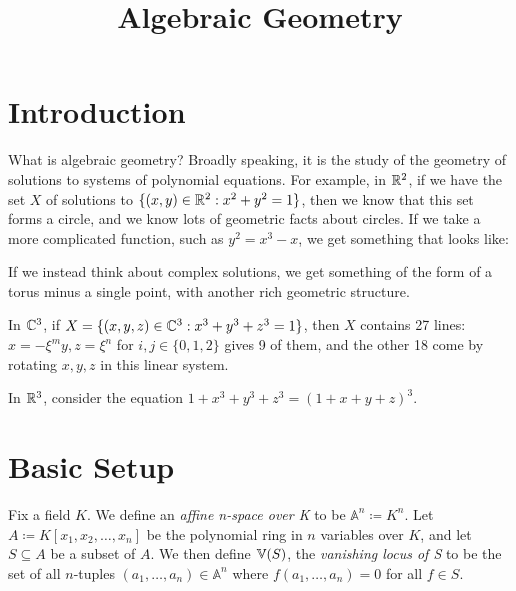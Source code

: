 \documentclass[10pt,a4paper,rgb]{article}
\title{Algebraic Geometry}
\begin{document}
\maketitle

\setcounter{section}{-1}

\section{Introduction}
What is algebraic geometry? Broadly speaking, it is the study of the geometry of solutions to systems of polynomial equations. For example, in $\mathbb{R}^2$, if we have the set $X$ of solutions to $\{(x,y)\in \mathbb{R}^2 : x^2+y^2 = 1\}$, then we know that this set forms a circle, and we know lots of geometric facts about circles. If we take a more complicated function, such as $y^2 = x^3-x$, we get something that looks like:

\begin{figure}[H]
\centering
{}
\end{figure}

If we instead think about complex solutions, we get something of the form of a torus minus a single point, with another rich geometric structure.

In $\mathbb{C}^3$, if $X = \{(x,y,z) \in \mathbb{C}^3 : x^3 + y^3 + z^3 = 1\}$, then $X$ contains 27 lines: $x = -\xi^m y, z = \xi^n$ for $i,j \in \{0,1,2\}$ gives 9 of them, and the other 18 come by rotating $x,y,z$ in this linear system.

In $\mathbb{R}^3$, consider the equation $1+x^3+y^3+z^3 = (1+x+y+z)^3$. %

\section{Basic Setup}
Fix a field $K$. We define an \emph{affine n-space over K} to be $\mathbb{A}^n \coloneqq K^n$. Let $A \coloneqq K[x_1,x_2,\ldots,x_n]$ be the polynomial ring in $n$ variables over $K$, and let $S \subseteq A$ be a subset of $A$. We then define $\mathbb{V}(S)$, the \emph{vanishing locus of S} to be the set of all $n$-tuples $(a_1,\ldots,a_n) \in \mathbb{A}^n$ where $f(a_1,\ldots,a_n) = 0$ for all $f \in S$.
\end{document}
